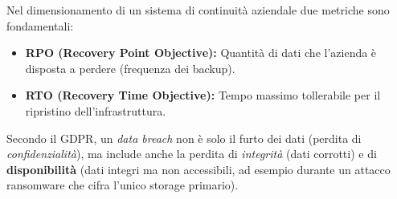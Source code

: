 Nel dimensionamento di un sistema di continuità aziendale due metriche sono fondamentali:
\begin{itemize}
    \item \textbf{RPO (Recovery Point Objective):} Quantità di dati che l'azienda è disposta a perdere (frequenza dei backup).
    \item \textbf{RTO (Recovery Time Objective):} Tempo massimo tollerabile per il ripristino dell'infrastruttura.
\end{itemize}

\begin{warningbox}
Secondo il GDPR, un \textit{data breach} non è solo il furto dei dati (perdita di \textit{confidenzialità}), ma include anche la perdita di \textit{integrità} (dati corrotti) e di \textbf{disponibilità} (dati integri ma non accessibili, ad esempio durante un attacco ransomware che cifra l'unico storage primario).
\end{warningbox}
